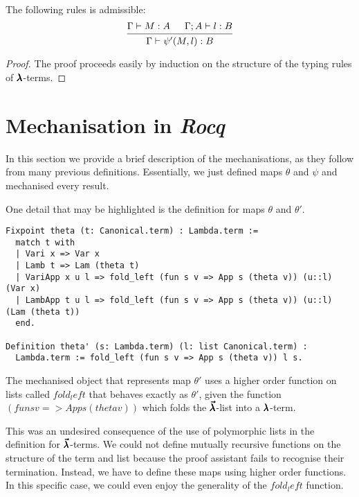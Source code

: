 \begin{theorem}
  The following rules is admissible:
  \[ \begin{prooftree}
      \hypo{ \Gamma \vdash M : A }
      \hypo{ \Gamma ; A \vdash l : B }
      \infer2{ \Gamma \vdash \psi'(M, l) : B }.
    \end{prooftree} \]
\end{theorem}
\begin{proof}
  The proof proceeds easily by induction on the structure of the typing rules of $\pmb{\lambda}$-terms.
\end{proof}


\section{Mechanisation in \textit{Rocq}}

In this section we provide a brief description of the mechanisations, as they follow from many previous definitions.
Essentially, we just defined maps $\theta$ and $\psi$ and mechanised every result.

One detail that may be highlighted is the definition for maps $\theta$ and $\theta'$.
\begin{lstlisting}[language=Coq]
Fixpoint theta (t: Canonical.term) : Lambda.term :=
  match t with
  | Vari x => Var x
  | Lamb t => Lam (theta t)
  | VariApp x u l => fold_left (fun s v => App s (theta v)) (u::l) (Var x)
  | LambApp t u l => fold_left (fun s v => App s (theta v)) (u::l) (Lam (theta t))
  end.

Definition theta' (s: Lambda.term) (l: list Canonical.term) :
  Lambda.term := fold_left (fun s v => App s (theta v)) l s.
\end{lstlisting}

The mechanised object that represents map $\theta'$ uses a higher order function on lists called \lst$fold_left$ that behaves exactly as $\theta'$, given the function \lst$(fun s v => App s (theta v))$ which folds the $\pmb{\vec \lambda}$-list into a $\pmb{\lambda}$-term.

This was an undesired consequence of the use of polymorphic lists in the definition for $\pmb{\vec \lambda}$-terms.
We could not define mutually recursive functions on the structure of the term and list because the proof assistant fails to recognise their termination.
Instead, we have to define these maps using higher order functions.
In this specific case, we could even enjoy the generality of the \lst$fold_left$ function.

